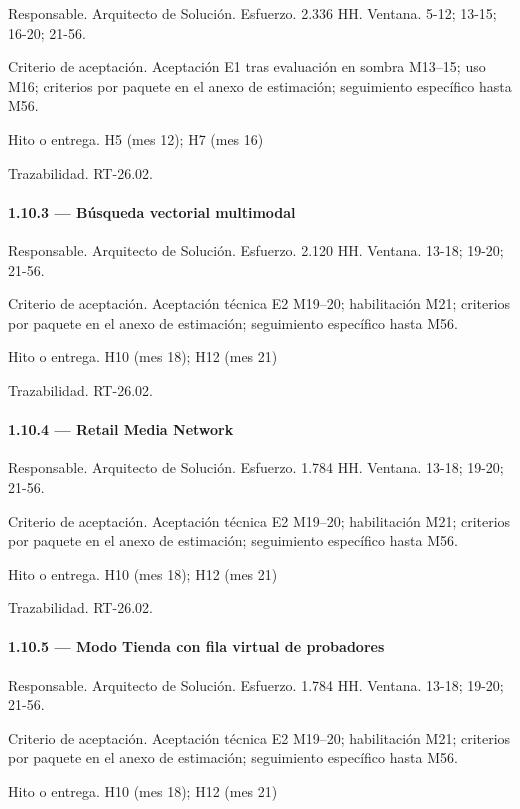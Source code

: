 \documentclass[11pt]{article}
\begin{document}
Responsable. Arquitecto de Solución. Esfuerzo. 2.336 HH. Ventana. 5-12; 13-15; 16-20; 21-56.

Criterio de aceptación. Aceptación E1 tras evaluación en sombra M13–15; uso M16; criterios por paquete en el anexo de estimación; seguimiento específico hasta M56.

Hito o entrega. H5 (mes 12); H7 (mes 16)

Trazabilidad. RT-26.02.

\paragraph{1.10.3 — Búsqueda vectorial multimodal}

Responsable. Arquitecto de Solución. Esfuerzo. 2.120 HH. Ventana. 13-18; 19-20; 21-56.

Criterio de aceptación. Aceptación técnica E2 M19–20; habilitación M21; criterios por paquete en el anexo de estimación; seguimiento específico hasta M56.

Hito o entrega. H10 (mes 18); H12 (mes 21)

Trazabilidad. RT-26.02.

\paragraph{1.10.4 — Retail Media Network}

Responsable. Arquitecto de Solución. Esfuerzo. 1.784 HH. Ventana. 13-18; 19-20; 21-56.

Criterio de aceptación. Aceptación técnica E2 M19–20; habilitación M21; criterios por paquete en el anexo de estimación; seguimiento específico hasta M56.

Hito o entrega. H10 (mes 18); H12 (mes 21)

Trazabilidad. RT-26.02.

\paragraph{1.10.5 — Modo Tienda con fila virtual de probadores}

Responsable. Arquitecto de Solución. Esfuerzo. 1.784 HH. Ventana. 13-18; 19-20; 21-56.

Criterio de aceptación. Aceptación técnica E2 M19–20; habilitación M21; criterios por paquete en el anexo de estimación; seguimiento específico hasta M56.

Hito o entrega. H10 (mes 18); H12 (mes 21)
\end{document}

